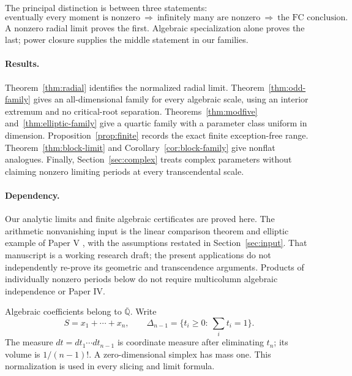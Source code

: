 \documentclass[11pt]{article}
\numberwithin{equation}{section}
\theoremstyle{definition}
\theoremstyle{remark}
\newcommand{\Qbar}{\overline{\mathbb Q}}
\begin{document}
The principal distinction is between three statements:
\[
 \text{eventually every moment is nonzero}
 \ \Longrightarrow\
 \text{infinitely many are nonzero}
 \ \Longrightarrow\
 \text{the FC conclusion}.
\]
A nonzero radial limit proves the first. Algebraic specialization alone
proves the last; power closure supplies the middle statement in our families.

\paragraph{Results.}
Theorem~\ref{thm:radial} identifies the normalized radial limit.
Theorem~\ref{thm:odd-family} gives an all-dimensional family for every
algebraic scale, using an interior extremum and no critical-root separation.
Theorems~\ref{thm:modfive} and~\ref{thm:elliptic-family} give a quartic family
with a parameter class uniform in dimension. Proposition~\ref{prop:finite}
records the exact finite exception-free range. Theorem~\ref{thm:block-limit}
and Corollary~\ref{cor:block-family} give nonflat analogues. Finally,
Section~\ref{sec:complex} treats complex parameters without claiming
nonzero limiting periods at every transcendental scale.

\paragraph{Dependency.}
Our analytic limits and finite algebraic certificates are proved here.
The arithmetic nonvanishing input is the linear comparison theorem and
elliptic example of Paper V \cite{PaperV}, with the assumptions restated in
Section~\ref{sec:input}. That manuscript is a working research draft;
the present applications do not independently re-prove its geometric and
transcendence arguments. Products of individually nonzero periods below do
not require multicolumn algebraic independence or Paper IV.

Algebraic coefficients belong to $\Qbar$. Write
\[
 S=x_1+\cdots+x_n,\qquad
 \Delta_{n-1}=\{t_i\ge0:\ \textstyle\sum_i t_i=1\}.
\]
The measure $dt=dt_1\cdots dt_{n-1}$ is coordinate measure after eliminating
$t_n$; its volume is $1/(n-1)!$. A zero-dimensional simplex has mass one.
This normalization is used in every slicing and limit formula.
\end{document}
